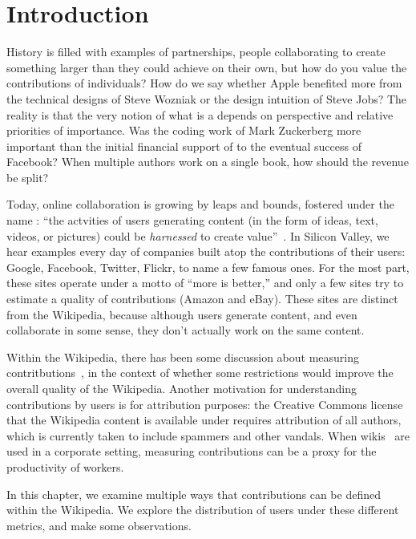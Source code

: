 
\section{Introduction}

History is filled with examples of partnerships, people collaborating
to create something larger than they could achieve on their own,
but how do you value the contributions of individuals?
How do we say whether Apple benefited more from the technical
designs of Steve Wozniak or the design intuition of Steve Jobs?
The reality is that the very notion of what is a 
depends on perspective and relative priorities of importance.
Was the coding work of Mark Zuckerberg more important than
the initial financial support of  to the eventual
success of Facebook?  
When multiple authors work on a single book, how should the
revenue be split?

Today, online collaboration is growing by leaps and bounds,
fostered under the name : ``the actvities of
users generating content (in the form of ideas, text,
videos, or pictures) could be \textit{harnessed} to
create value''~\cite{wiki:Web20}.
In Silicon Valley, we hear examples every day of companies
built atop the contributions of their users:
Google, Facebook, Twitter, Flickr, to name a few famous ones.
For the most part, these sites operate under a motto
of ``more is better,'' and only a few sites try to estimate
a quality of contributions (\eg Amazon and eBay).
These sites are distinct from the Wikipedia, because although
users generate content, and even collaborate in some sense,
they don't actually work on the same content.

Within the Wikipedia, there has been some discussion
about measuring contritbutions~\cite{Wales2005,Swartz2006},
in the context of whether some restrictions would improve
the overall quality of the Wikipedia.
Another motivation for understanding contributions by
users is for attribution purposes: the Creative Commons license
that the Wikipedia content is available under requires attribution
of all authors, which is currently taken to include spammers
and other vandals.
When wikis~\cite{Leuf2001} are used in a corporate setting,
measuring contributions can be a proxy for the productivity
of workers.

In this chapter, we examine multiple ways that contributions
can be defined within the Wikipedia.
We explore the distribution of users under these different metrics,
and make some observations.


